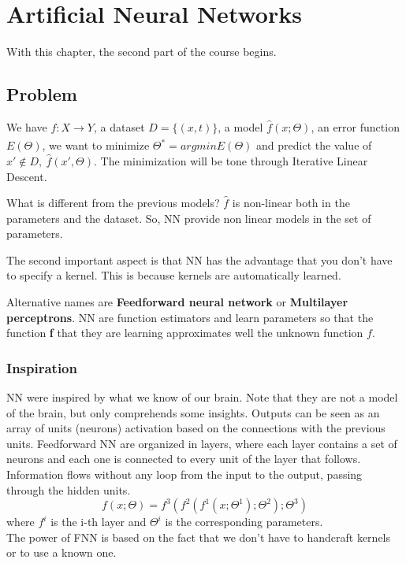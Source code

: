 \section{Artificial Neural Networks}
With this chapter, the second part of the course begins.

\subsection{Problem}
We have $f: X \xrightarrow[]{}Y$, a dataset $D=\{(x, t)\}$, a model $\hat{f} (x; \Theta)$, an error function $E(\Theta)$, we want to minimize $\Theta^{*} = argmin E(\Theta)$ and predict the value of $x' \not\in D,\ \hat{f}(x', \Theta)$. The minimization will be tone through Iterative Linear Descent.

What is different from the previous models? $\hat{f}$ is non-linear both in the parameters and the dataset. So, NN provide non linear models in the set of parameters.

The second important aspect is that NN has the advantage that you don't have to specify a kernel. This is because kernels are automatically learned.

Alternative names are \textbf{Feedforward neural network} or \textbf{Multilayer perceptrons}. NN are function estimators and learn parameters so that the function \textbf{f} that they are learning approximates well the unknown function $f$.

\subsubsection{Inspiration}
NN were inspired by what we know of our brain. Note that they are not a model of the brain, but only comprehends some insights. Outputs can be seen as an array of units (neurons) activation based on the connections with the previous units. Feedforward NN are organized in layers, where each layer contains a set of neurons and each one is connected to every unit of the layer that follows. Information flows without any loop from the input to the output, passing through the hidden units.
\begin{equation}
    f(x; \Theta) = f^{3}(f^{2}(f^{1}(x; \Theta^{1}); \Theta^{2}); \Theta^{3})
\end{equation}
where $f^{i}$ is the i-th layer and $\Theta^{i}$ is the corresponding parameters.\\

The power of FNN is based on the fact that we don't have to handcraft kernels or to use a known one.\\
